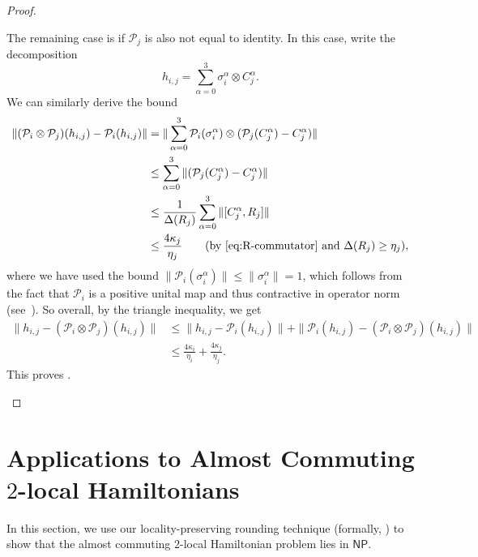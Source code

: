 \documentclass[a4paper,onecolumn,11pt]{quantumarticle}
\theoremstyle{plain}
\renewcommand{\cP}{\mathcal{P}}
\begin{document}
\begin{proof}
\begin{enumerate}
The remaining case is if $\cP_j$ is also not equal to identity. In this case, write the decomposition
\[ h_{i,j} = \sum_{\alpha=0}^{3} \sigma_i^\alpha \otimes C_j^\alpha. \]
We can similarly derive the bound
\begin{align}
    \| (\cP_i \otimes \cP_j)(h_{i,j}) - \cP_i(h_{i,j}) \| &= \| \sum_{\alpha =0}^3 \cP_i(\sigma_i^\alpha) \otimes (\cP_j(C_j^\alpha) - C_j^\alpha) \| \\
    &\leq  \sum_{\alpha =0}^3 \| (\cP_j(C_j^\alpha) - C_j^\alpha) \| \\
    &\leq \frac{1}{\Delta(R_j)} \sum_{\alpha =0}^3 \| [C_j^\alpha, R_j] \| \\
    &\leq \frac{4\kappa_j}{\eta_j} \qquad \text{(by \Cref{eq:R-commutator} and } \Delta(R_j) \geq \eta_j),
\end{align}
where we have used the bound $\| \cP_i(\sigma_i^\alpha) \| \leq \| \sigma_i^\alpha \| = 1$, which follows from the fact that $\cP_i$ is a positive unital map and thus contractive in operator norm (see~\cite[Theorem~6.12]{Watrous_2018}). 
So overall, by the triangle inequality, we get
\begin{align}
    \| h_{i,j} - (\cP_i \otimes \cP_j)(h_{i,j})  \| &\leq \| h_{i,j} - \cP_i(h_{i,j}) \| + \| \cP_i(h_{i,j}) - (\cP_i \otimes \cP_j)(h_{i,j}) \| \\
    &\leq \frac{4\kappa_i}{\eta_i} + \frac{4\kappa_j}{\eta_j}.
\end{align}
This proves .
\end{enumerate}
\end{proof}

\section{Applications to Almost Commuting $2$-local Hamiltonians}
In this section, we use our locality-preserving rounding technique (formally, ) to show that the almost commuting $2$-local Hamiltonian problem lies in $\mathsf{NP}$.
\end{document}
